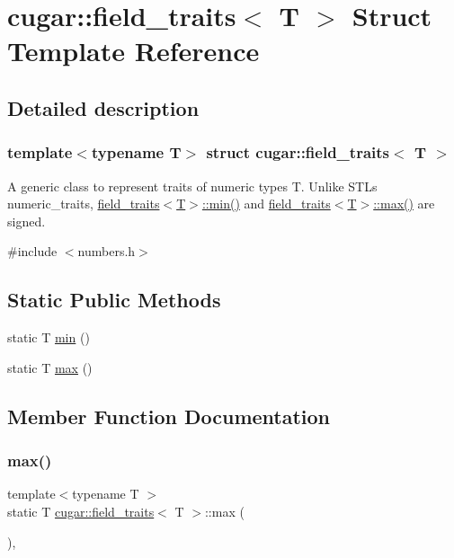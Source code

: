 \hypertarget{structcugar_1_1field__traits}{}\section{cugar\+:\+:field\+\_\+traits$<$ T $>$ Struct Template Reference}
\label{structcugar_1_1field__traits}


\subsection{Detailed description}
\subsubsection*{template$<$typename T$>$\newline
struct cugar\+::field\+\_\+traits$<$ T $>$}

A generic class to represent traits of numeric types T. Unlike S\+TL\textquotesingle{}s numeric\+\_\+traits, \hyperlink{structcugar_1_1field__traits_ad4b1179d58dbf86897d4c9a7d9b53f6d}{field\+\_\+traits$<$\+T$>$\+::min()} and \hyperlink{structcugar_1_1field__traits_a6f3732317c452f66e22bfb1e31da563b}{field\+\_\+traits$<$\+T$>$\+::max()} are signed. 

{\ttfamily \#include $<$numbers.\+h$>$}

\subsection*{Static Public Methods}
\begin{DoxyCompactItemize}
\item 
static T \hyperlink{structcugar_1_1field__traits_ad4b1179d58dbf86897d4c9a7d9b53f6d}{min} ()
\item 
static T \hyperlink{structcugar_1_1field__traits_a6f3732317c452f66e22bfb1e31da563b}{max} ()
\end{DoxyCompactItemize}


\subsection{Member Function Documentation}
\mbox{\label{structcugar_1_1field__traits_a6f3732317c452f66e22bfb1e31da563b}} 
\subsubsection{\texorpdfstring{max()}{max()}}
{\footnotesize\ttfamily template$<$typename T $>$ \\
static T \hyperlink{structcugar_1_1field__traits}{cugar\+::field\+\_\+traits}$<$ T $>$\+::max (\begin{DoxyParamCaption}{ }\end{DoxyParamCaption})\hspace{0.3cm}{\ttfamily [inline]}, {\ttfamily [static]}}

